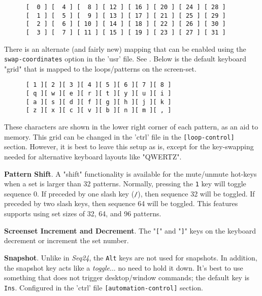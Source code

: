    \begin{verbatim}
      [  0 ] [  4 ] [  8 ] [ 12 ] [ 16 ] [ 20 ] [ 24 ] [ 28 ]
      [  1 ] [  5 ] [  9 ] [ 13 ] [ 17 ] [ 21 ] [ 25 ] [ 29 ]
      [  2 ] [  6 ] [ 10 ] [ 14 ] [ 18 ] [ 22 ] [ 26 ] [ 30 ]
      [  3 ] [  7 ] [ 11 ] [ 15 ] [ 19 ] [ 23 ] [ 27 ] [ 31 ]
   \end{verbatim}

   There is an alternate (and fairly new) mapping that can be enabled
   using the \texttt{swap-coordinates} option in the 'usr' file.
   See .
   Below is the default keyboard "grid" that is
   mapped to the loops/patterns on the screen-set.

   \begin{verbatim}
      [ 1 ][ 2 ][ 3 ][ 4 ][ 5 ][ 6 ][ 7 ][ 8 ]
      [ q ][ w ][ e ][ r ][ t ][ y ][ u ][ i ]
      [ a ][ s ][ d ][ f ][ g ][ h ][ j ][ k ]
      [ z ][ x ][ c ][ v ][ b ][ n ][ m ][ , ]
   \end{verbatim}

   These characters are shown in the lower right corner of each
   pattern, as an aid to memory.
   This grid can be changed in the 'ctrl' file in the
   \texttt{[loop-control]} section.
   However, it is best to leave this setup as is, except for the key-swapping
   needed for alternative keyboard layouts like "QWERTZ".

   \textbf{Pattern Shift}.
   A "shift" functionality is available for the
   mute/unmute hot-keys when a set is larger than 32 patterns.
   Normally, pressing the \texttt{1} key will toggle
   sequence 0.  If preceded by one slash key (\texttt{/}), then sequence 32
   will be toggled.  If preceded by two slash keys, then sequence 64 will be
   toggled.  This features supports using set sizes of 32, 64, and 96 patterns.

   \index{keys![}
   \textbf{Screenset Increment and Decrement}.
   The "\texttt{[}" and
   \index{keys!]}
   "\texttt{]}" keys on the keyboard decrement or increment the set number.

   \textbf{Snapshot}.
   Unlike in \textsl{Seq24}, the \texttt{Alt} keys are not used for snapshots.
   In addition, the snapshot key acts like a \textsl{toggle}...
   no need to hold it down.
   It's best to use something that does not trigger desktop/window
   commands; the default key is \texttt{Ins}.
   Configured in the 'ctrl' file \texttt{[automation-control]} section.

